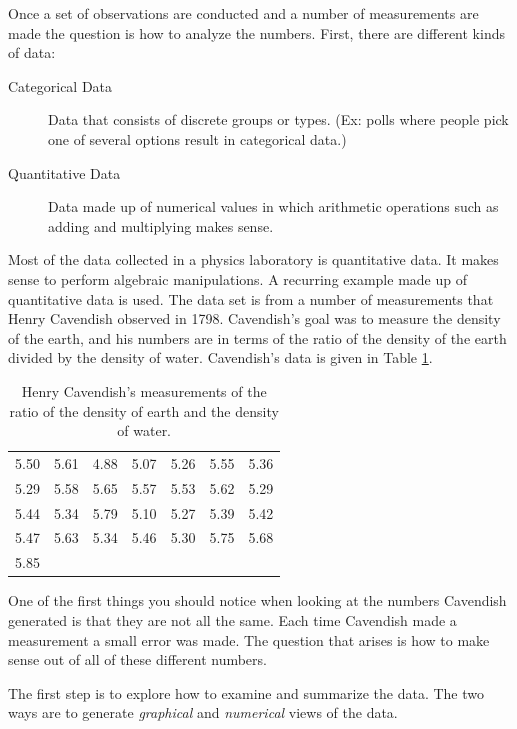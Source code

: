 \documentclass[12pt]{article}
\begin{document}
Once a set of observations are conducted and a number of measurements
are made the question is how to analyze the numbers.  First, there are
different kinds of data:
\begin{description}
\item[Categorical Data] Data that consists of discrete groups or
  types. (Ex: polls where people pick one of several options result in
  categorical data.)
\item[Quantitative Data] Data made up of numerical values in which
  arithmetic operations such as adding and multiplying makes sense.
\end{description}

Most of the data collected in a physics laboratory is quantitative
data.  It makes sense to perform algebraic manipulations.  A recurring
example made up of quantitative data is used. The data set is from a
number of measurements that Henry Cavendish observed in
1798\cite{mooreMccabe}.  Cavendish's goal was to measure the density
of the earth, and his numbers are in terms of the ratio of the density
of the earth divided by the density of water. Cavendish's data is
given in Table \ref{table:cavendish}.


\begin{table}[ht]
  \centering
  \begin{tabular}{rrrrrrr}
    5.50 & 5.61 & 4.88 & 5.07 & 5.26 & 5.55 & 5.36 \\
    5.29 & 5.58 & 5.65 & 5.57 & 5.53 & 5.62 & 5.29 \\
    5.44 & 5.34 & 5.79 & 5.10 & 5.27 & 5.39 & 5.42 \\
    5.47 & 5.63 & 5.34 & 5.46 & 5.30 & 5.75 & 5.68 \\
    5.85    \\
  \end{tabular}
  \caption{Henry Cavendish's measurements of the ratio of the density of earth and the density of water.}
  \label{table:cavendish}
\end{table}

One of the first things you should notice when looking at the numbers
Cavendish generated is that they are not all the same. Each time
Cavendish made a measurement a small error was made.  The question
that arises is how to make sense out of all of these different
numbers.

The first step is to explore how to examine and summarize the data.
The two ways are to generate \textit{graphical} and \textit{numerical}
views of the data.
\end{document}
